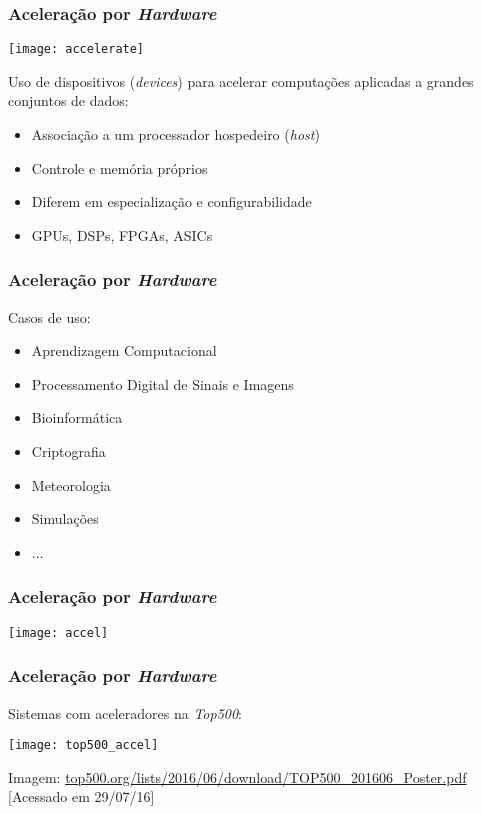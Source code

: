 \documentclass[10pt, compress, aspectratio=43, xcolor={table,usenames,dvipsnames}]{beamer}
\begin{document}
\begin{frame}
    \frametitle{Aceleração por \textit{Hardware}}
    \begin{center}
        \texttt{[image: accelerate]}
    \end{center}

    Uso de \alert{dispositivos} (\textit{devices}) para acelerar computações
    aplicadas a grandes conjuntos de dados:
    \begin{itemize}
        \item Associação a um processador \alert{hospedeiro} (\textit{host})
        \item \alert{Controle} e \alert{memória} próprios
        \item Diferem em \alert{especialização} e \alert{configurabilidade}
        \item \alert{GPUs}, DSPs, FPGAs, ASICs
    \end{itemize}
\end{frame}

\begin{frame}
    \frametitle{Aceleração por \textit{Hardware}}
    Casos de uso:
    \begin{itemize}
        \item Aprendizagem Computacional
        \item Processamento Digital de Sinais e Imagens
        \item Bioinformática
        \item Criptografia
        \item Meteorologia
        \item Simulações
        \item ...
    \end{itemize}
\end{frame}

\begin{frame}
    \frametitle{Aceleração por \textit{Hardware}}
    \centering
    \texttt{[image: accel]}
\end{frame}

\begin{frame}
    \frametitle{Aceleração por \textit{Hardware}}
    Sistemas com aceleradores na \textit{Top500}:

    \begin{center}
    \texttt{[image: top500\_accel]}
    \hfill

        \tiny{Imagem: \url{top500.org/lists/2016/06/download/TOP500_201606_Poster.pdf} [Acessado em 29/07/16]}
    \end{center}
\end{frame}
\end{document}
